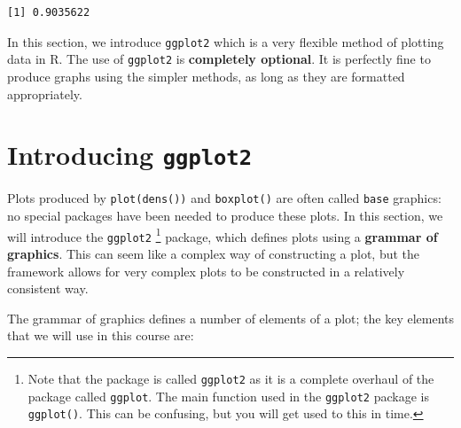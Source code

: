 \documentclass[
  a4paper,
]{memoir}
\begin{document}
\begin{verbatim}
[1] 0.9035622
\end{verbatim}

\begin{tcolorbox}[enhanced jigsaw, arc=.35mm, bottomrule=.15mm, bottomtitle=1mm, breakable, colback=white, colbacktitle=quarto-callout-note-color!10!white, colframe=quarto-callout-note-color-frame, coltitle=black, left=2mm, leftrule=.75mm, opacityback=0, opacitybacktitle=0.6, rightrule=.15mm, title=\textcolor{quarto-callout-note-color}{\faInfo}\hspace{0.5em}{Note}, titlerule=0mm, toprule=.15mm, toptitle=1mm]

In this section, we introduce \texttt{ggplot2} which is a very flexible
method of plotting data in R. The use of \texttt{ggplot2} is
\textbf{completely optional}. It is perfectly fine to produce graphs
using the simpler methods, as long as they are formatted appropriately.

\end{tcolorbox}

\section{\texorpdfstring{Introducing
\texttt{ggplot2}}{Introducing ggplot2}}\label{introducing-ggplot2}

Plots produced by \texttt{plot(dens())} and \texttt{boxplot()} are often
called \texttt{base} graphics: no special packages have been needed to
produce these plots. In this section, we will introduce the
\texttt{ggplot2} \footnote{Note that the package is called
  \texttt{ggplot2} as it is a complete overhaul of the package called
  \texttt{ggplot}. The main function used in the \texttt{ggplot2}
  package is \texttt{ggplot()}. This can be confusing, but you will get
  used to this in time.} package, which defines plots using a
\textbf{grammar of graphics}. This can seem like a complex way of
constructing a plot, but the framework allows for very complex plots to
be constructed in a relatively consistent way.

The grammar of graphics defines a number of elements of a plot; the key
elements that we will use in this course are:
\end{document}
